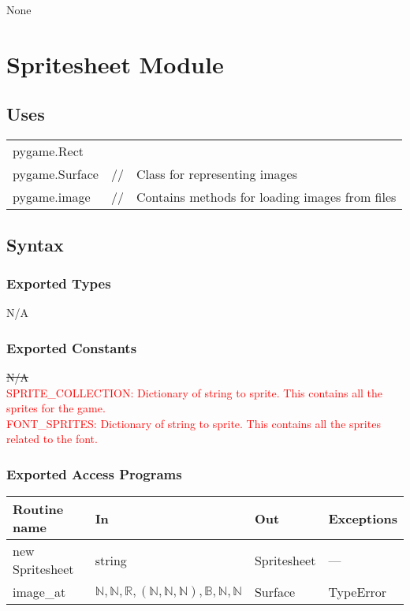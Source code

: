 \documentclass[12pt]{article}
\begin{document}
None

\newpage

\section* {Spritesheet Module}

\subsection* {Uses}

\begin{tabular}{lll}
    pygame.Rect & & \\
    pygame.Surface & // & Class for representing images\\
    pygame.image & // & Contains methods for loading images from files
\end{tabular}

\subsection* {Syntax}

\subsubsection* {Exported Types}

N/A

\subsubsection* {Exported Constants}

\st{N/A}\\
\textcolor{red}{
SPRITE\_COLLECTION: Dictionary of string to sprite. This contains all the sprites for the game.\\
FONT\_SPRITES: Dictionary of string to sprite. This contains all the sprites related to the font.
}

\subsubsection* {Exported Access Programs}

\begin{tabular}{| l | l | l | p{5cm} |}
\hline
\textbf{Routine name} & \textbf{In} & \textbf{Out} & \textbf{Exceptions}\\
\hline
new Spritesheet & string & Spritesheet & ---\\
\hline
image\_at & $\mathbb{N}, \mathbb{N}, \mathbb{R}, (\mathbb{N}, \mathbb{N}, \mathbb{N}), \mathbb{B}, \mathbb{N}, \mathbb{N}$ & Surface & TypeError\\
\hline
\end{tabular}
\end{document}
